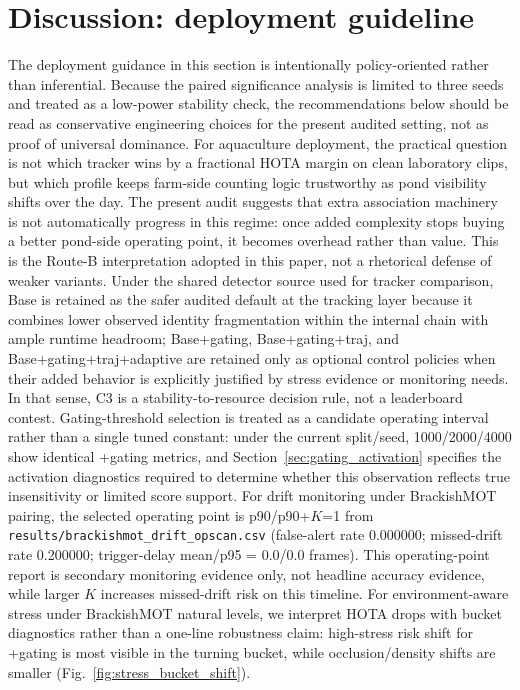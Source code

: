 \documentclass[5p,twocolumn,a4paper]{elsarticle}
\begin{document}
\section{Discussion: deployment guideline}
\label{sec:deployment_guideline}
The deployment guidance in this section is intentionally policy-oriented rather than inferential. Because the paired significance analysis is limited to three seeds and treated as a low-power stability check, the recommendations below should be read as conservative engineering choices for the present audited setting, not as proof of universal dominance.
For aquaculture deployment, the practical question is not which tracker wins by a fractional HOTA margin on clean laboratory clips, but which profile keeps farm-side counting logic trustworthy as pond visibility shifts over the day. The present audit suggests that extra association machinery is not automatically progress in this regime: once added complexity stops buying a better pond-side operating point, it becomes overhead rather than value.
This is the Route-B interpretation adopted in this paper, not a rhetorical defense of weaker variants. Under the shared detector source used for tracker comparison, Base is retained as the safer audited default at the tracking layer because it combines lower observed identity fragmentation within the internal chain with ample runtime headroom; Base+gating, Base+gating+traj, and Base+gating+traj+adaptive are retained only as optional control policies when their added behavior is explicitly justified by stress evidence or monitoring needs. In that sense, C3 is a stability-to-resource decision rule, not a leaderboard contest.
Gating-threshold selection is treated as a candidate operating interval rather than a single tuned constant: under the current split/seed, 1000/2000/4000 show identical +gating metrics, and Section~\ref{sec:gating_activation} specifies the activation diagnostics required to determine whether this observation reflects true insensitivity or limited score support.
For drift monitoring under BrackishMOT pairing, the selected operating point is p90/p90+$K$=1 from \texttt{results/brackishmot\_drift\_opscan.csv} (false-alert rate 0.000000; missed-drift rate 0.200000; trigger-delay mean/p95 = 0.0/0.0 frames). This operating-point report is secondary monitoring evidence only, not headline accuracy evidence, while larger $K$ increases missed-drift risk on this timeline.
For environment-aware stress under BrackishMOT natural levels, we interpret HOTA drops with bucket diagnostics rather than a one-line robustness claim: high-stress risk shift for +gating is most visible in the turning bucket, while occlusion/density shifts are smaller (Fig.~\ref{fig:stress_bucket_shift}).
\end{document}
